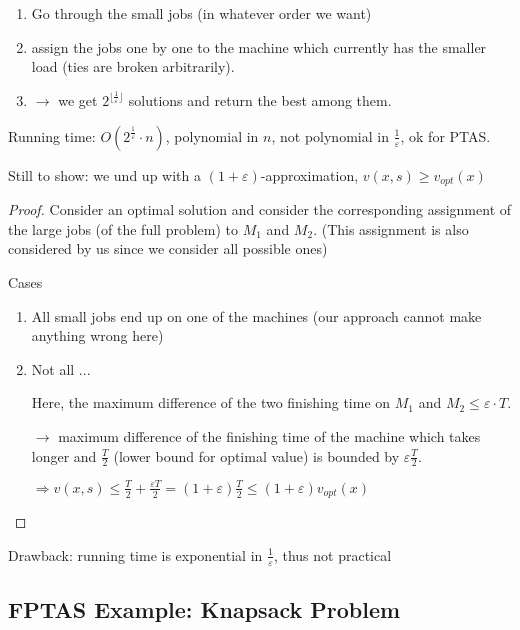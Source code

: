 \documentclass[11pt]{article}
\theoremstyle{definition}
\theoremstyle{definition}
\begin{document}
\begin{enumerate}
\item Go through the small jobs (in whatever order we want)
\item assign the jobs one by one to the machine which currently has the smaller load (ties are broken arbitrarily).
\item $ \rightarrow $ we get $ 2^{ \lfloor \frac{1}{\varepsilon} \rfloor} $ solutions and return the best among them.
\end{enumerate}

Running time: $O (2^{\frac{1}{\varepsilon}} \cdot n ) $, polynomial in $ n $, not polynomial in $ \frac{1}{\varepsilon} $, ok for PTAS. %

Still to show: we und up with a $ ( 1+ \varepsilon )$-approximation, $ v(x, s) \geq v_{opt} (x) $

\begin{proof}
Consider an optimal solution and consider the corresponding assignment of the large jobs (of the full problem) to $ M_1 $ and $ M_2 $. (This assignment is also considered by us since we consider all possible ones)

Cases
\begin{enumerate}
\item All small jobs end up on one of the machines (our approach cannot make anything wrong here)
\item Not all ...
	
	Here, the maximum difference of the two finishing time on $ M_1 $ and $ M_2 \leq \varepsilon \cdot T $.
	
	$ \rightarrow $ maximum difference of the finishing time of the machine which takes longer and $ \frac{T}{2} $ (lower bound for optimal value) is bounded by $ \varepsilon \frac{T}{2} $.
	
	$ \Rightarrow v(x, s) \leq \frac{T}{2} + \frac{\varepsilon T}{2} = (1 + \varepsilon) \frac{T}{2} \leq (1 + \varepsilon) v_{opt} (x) $
\end{enumerate}

\end{proof}

Drawback: running time is exponential in $ \frac{1}{\varepsilon} $, thus not practical

\subsection{FPTAS Example: Knapsack Problem}
\end{document}
